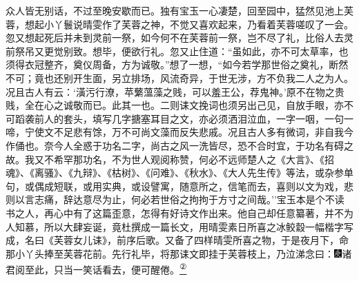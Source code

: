 众人皆无别话，不过至晚安歇而已。独有宝玉一心凄楚，回至园中，猛然见池上芙蓉，想起小丫鬟说晴雯作了芙蓉之神，不觉又喜欢起来，乃看着芙蓉嗟叹了一会。忽又想起死后并未到灵前一祭，如今何不在芙蓉前一祭，岂不尽了礼，比俗人去灵前祭吊又更觉别致。想毕，便欲行礼。忽又止住道：``虽如此，亦不可太草率，也须得衣冠整齐，奠仪周备，方为诚敬。''想了一想，``如今若学那世俗之奠礼，断然不可；竟也还别开生面，另立排场，风流奇异，于世无涉，方不负我二人之为人。况且古人有云：`潢污行潦，苹蘩薀藻之贱，可以羞王公，荐鬼神。'原不在物之贵贱，全在心之诚敬而已。此其一也。二则诔文挽词也须另出己见，自放手眼，亦不可蹈袭前人的套头，填写几字搪塞耳目之文，亦必须洒泪泣血，一字一咽，一句一啼，宁使文不足悲有馀，万不可尚文藻而反失悲戚。况且古人多有微词，非自我今作俑也。奈今人全惑于功名二字，尚古之风一洗皆尽，恐不合时宜，于功名有碍之故。我又不希罕那功名，不为世人观阅称赞，何必不远师楚人之《大言》、《招魂》、《离骚》、《九辩》、《枯树》、《问难》、《秋水》、《大人先生传》等法，或杂参单句，或偶成短联，或用实典，或设譬寓，随意所之，信笔而去，喜则以文为戏，悲则以言志痛，辞达意尽为止，何必若世俗之拘拘于方寸之间哉。''宝玉本是个不读书之人，再心中有了这篇歪意，怎得有好诗文作出来。他自己却任意纂著，并不为人知慕，所以大肆妄诞，竟杜撰成一篇长文，用晴雯素日所喜之冰鲛縠一幅楷字写成，名曰《芙蓉女儿诔》，前序后歌。又备了四样晴雯所喜之物，于是夜月下，命那小丫头捧至芙蓉花前。先行礼毕，将那诔文即挂于芙蓉枝上，乃泣涕念曰：{\includegraphics[width=3mm]{../Images/00004}诸君阅至此，只当一笑话看去，便可醒倦。}\href{../Text/part0082_split_000.html\#lnkback_2_a}{\textsuperscript{②}}

